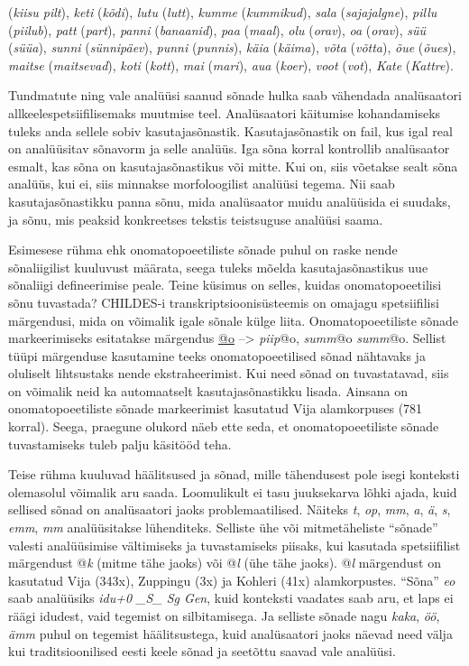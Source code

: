 \documentclass[12pt]{article}
\begin{document}
(\emph{kiisu pilt}), \emph{keti} (\emph{kõdi}), \emph{lutu} (\emph{lutt}), \emph{kumme} (\emph{kummikud}), \emph{sala} (\emph{sajajalgne}), \emph{pillu} (\emph{piilub}), \emph{patt} (\emph{part}), \emph{panni} (\emph{banaanid}), \emph{paa} (\emph{maal}), \emph{olu} (\emph{orav}), \emph{oa} (\emph{orav}), \emph{süü} (\emph{süüa}), \emph{sunni} (\emph{sünnipäev}), \emph{punni} (\emph{punnis}), \emph{käia} (\emph{käima}), \emph{võta} (\emph{võtta}), \emph{õue} (\emph{õues}), \emph{maitse} (\emph{maitsevad}), \emph{koti} (\emph{kott}), \emph{mai} (\emph{mari}), \emph{aua} (\emph{koer}), \emph{voot} (\emph{vot}), \emph{Kate} (\emph{Kattre}).

Tundmatute ning vale analüüsi saanud sõnade hulka saab vähendada analüsaatori allkeelespetsiifilisemaks muutmise teel. Analüsaatori käitumise kohandamiseks tuleks anda sellele sobiv kasutajasõnastik. Kasutajasõnastik on fail, kus igal real on analüüsitav sõnavorm ja selle analüüs. Iga sõna korral kontrollib analüsaator esmalt, kas sõna on kasutajasõnastikus või mitte. Kui on, siis võetakse sealt sõna analüüs, kui ei, siis minnakse morfoloogilist analüüsi tegema. Nii saab kasutajasõnastikku panna sõnu, mida analüsaator muidu analüüsida ei suudaks, ja sõnu, mis peaksid konkreetses tekstis teistsuguse analüüsi saama.

Esimesese rühma ehk onomatopoeetiliste sõnade puhul on raske nende sõnaliigilist kuuluvust määrata, seega tuleks mõelda kasutajasõnastikus uue sõnaliigi defineerimise peale. Teine küsimus on selles, kuidas onomatopoeetilisi sõnu tuvastada? CHILDES-i transkriptsioonisüsteemis on omajagu spetsiifilisi märgendusi, mida on võimalik igale sõnale külge liita. Onomatopoeetiliste sõnade markeerimiseks esitatakse märgendus \underline{@o} --> \emph{piip}@o, \emph{summ}@o \emph{summ}@o. Sellist tüüpi märgenduse kasutamine teeks onomatopoeetilised sõnad nähtavaks ja oluliselt lihtsustaks nende ekstraheerimist. Kui need sõnad on tuvastatavad, siis on võimalik neid ka automaatselt kasutajasõnastikku lisada. Ainsana on onomatopoeetiliste sõnade markeerimist kasutatud Vija alamkorpuses (781 korral). Seega, praegune olukord näeb ette seda, et onomatopoeetiliste sõnade tuvastamiseks tuleb palju käsitööd teha.

Teise rühma kuuluvad häälitsused ja sõnad, mille tähendusest pole isegi konteksti olemasolul võimalik aru saada. Loomulikult ei tasu juuksekarva lõhki ajada, kuid sellised sõnad on analüsaatori jaoks problemaatilised. Näiteks \emph{t}, \emph{op},  \emph{mm}, \emph{a}, \emph{ä}, \emph{s}, \emph{emm}, \emph{mm} analüüsitakse lühenditeks. Selliste ühe või mitmetäheliste ``sõnade'' valesti analüüsimise vältimiseks ja tuvastamiseks piisaks, kui kasutada spetsiifilist märgendust @\emph{k} (mitme tähe jaoks) või @\emph{l} (ühe tähe jaoks). @\emph{l} märgendust on kasutatud Vija (343x), Zuppingu (3x) ja Kohleri (41x) alamkorpustes. ``Sõna'' \emph{eo} saab analüüsiks \emph{idu+0 \_S\_ Sg Gen}, kuid konteksti vaadates saab aru, et laps ei räägi idudest, vaid tegemist on silbitamisega. Ja selliste sõnade nagu \emph{kaka}, \emph{öö}, \emph{ämm} puhul on tegemist häälitsustega, kuid analüsaatori jaoks näevad need välja kui traditsioonilised eesti keele sõnad ja seetõttu saavad vale analüüsi.
\end{document}
